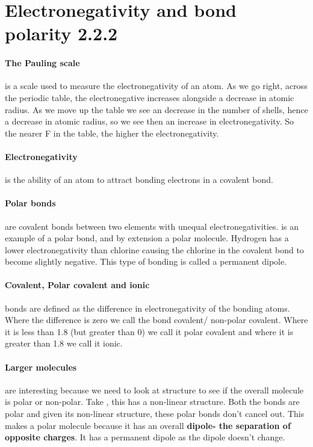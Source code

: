   \section{Electronegativity and bond polarity 2.2.2}
	\paragraph{The Pauling scale} is a scale used to measure the electronegativity of an atom. As we go right, across the periodic table, the electronegative increases alongside a decrease in atomic radius. As we move up the table we see an decrease in the number of shells, hence a decrease in atomic radius, so we see then an increase in electronegativity. So the nearer F in the table, the higher the electronegativity.
	
	\paragraph{Electronegativity} is the ability of an atom to attract bonding electrons in a covalent bond.
	
	\paragraph{Polar bonds} are covalent bonds between two elements with unequal electronegativities.
	 is an example of a polar bond, and by extension a polar molecule.
	Hydrogen has a lower electronegativity than chlorine causing the chlorine in the covalent bond to become slightly negative.
	This type of bonding is called a permanent dipole.

	\paragraph{Covalent, Polar covalent and ionic} bonds are defined as the difference in electronegativity of the bonding atoms.
	Where the difference is zero we call the bond covalent/ non-polar covalent.
	Where it is less than 1.8 (but greater than 0) we call it polar covalent and where it is greater than 1.8 we call it ionic.
	
	\paragraph{Larger molecules} are interesting because we need to look at structure to see if the overall molecule is polar or non-polar.
	Take , this has a non-linear structure. Both the  bonds are polar and given its non-linear structure, these polar bonds don't cancel out.
	This makes  a polar molecule because it has an overall \textbf{dipole- the separation of opposite charges}. It has a permanent dipole as the dipole doesn't change.

